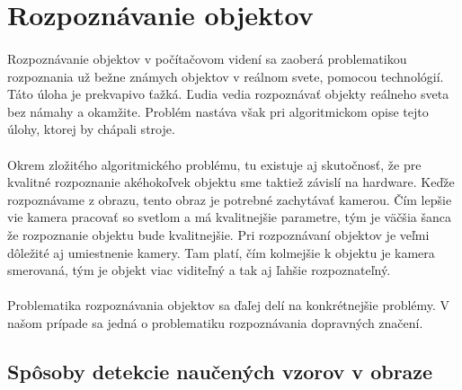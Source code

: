 \documentclass[12pt]{article}
\begin{document}
\section{Rozpoznávanie objektov}
\paragraph{}
Rozpoznávanie objektov v počítačovom videní sa zaoberá problematikou rozpoznania už bežne známych objektov v reálnom svete, pomocou technológií.
Táto úloha je prekvapivo ťažká. Ľudia vedia rozpoznávať objekty reálneho sveta bez námahy a okamžite. Problém nastáva však pri algoritmickom opise tejto úlohy, ktorej by chápali stroje.
\cite{machine_vission}
\paragraph{}
Okrem zložitého algoritmického problému, tu existuje aj skutočnosť, že pre kvalitné rozpoznanie akéhokoľvek objektu sme taktiež závislí na hardware.
Keďže rozpoznávame z obrazu, tento obraz je potrebné zachytávať kamerou. Čím lepšie vie kamera pracovať so svetlom a má kvalitnejšie parametre, tým je väčšia šanca že rozpoznanie objektu bude kvalitnejšie.
Pri rozpoznávaní objektov je veľmi dôležité aj umiestnenie kamery. Tam platí, čím kolmejšie k objektu je kamera smerovaná, tým je objekt viac viditeľný a tak aj ľahšie rozpoznateľný. 
\cite{machine_vission}
\paragraph{}
Problematika rozpoznávania objektov sa ďaľej delí na konkrétnejšie problémy. V našom prípade sa jedná o problematiku rozpoznávania dopravných značení.
\cite{machine_vission}
\subsection{Spôsoby detekcie naučených vzorov v obraze}
\end{document}
